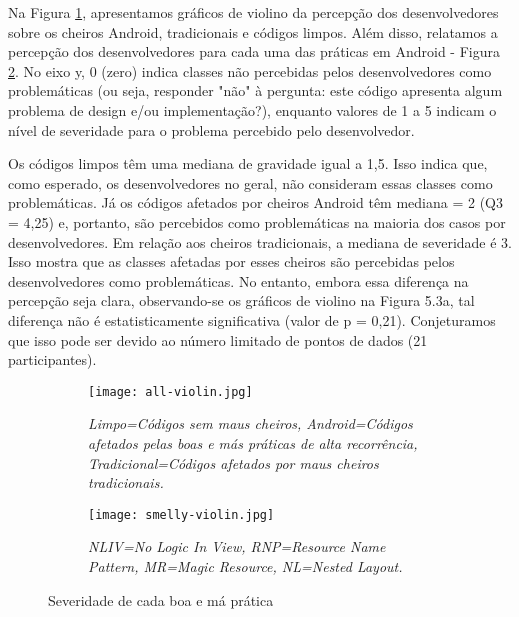 Na Figura \ref{fig:all-violin}, apresentamos gráficos de violino da percepção dos desenvolvedores sobre os cheiros Android, tradicionais e códigos limpos. Além disso, relatamos a percepção dos desenvolvedores para cada uma das práticas em Android - Figura \ref{fig:smelly-violin}. No eixo y, 0 (zero) indica classes não percebidas pelos desenvolvedores como problemáticas (ou seja, responder "não" à pergunta: este código apresenta algum problema de design e/ou implementação?), enquanto valores de 1 a 5 indicam o nível de severidade para o problema percebido pelo desenvolvedor.

Os códigos limpos têm uma mediana de gravidade igual a 1,5. Isso indica que, como esperado, os desenvolvedores no geral, não consideram essas classes como problemáticas. Já os códigos afetados por cheiros Android têm mediana = 2 (Q3 = 4,25) e, portanto, são percebidos como problemáticas na maioria dos casos por desenvolvedores. Em relação aos cheiros tradicionais, a mediana de severidade é 3. Isso mostra que as classes afetadas por esses cheiros são percebidas pelos desenvolvedores como problemáticas. No entanto, embora essa diferença na percepção seja clara, observando-se os gráficos de violino na Figura 5.3a, tal diferença não é estatisticamente significativa (valor de p = 0,21). Conjeturamos que isso pode ser devido ao número limitado de pontos de dados (21 participantes).

\begin{figure*}
\centering
\begin{subfigure}{.4\textwidth}
  \centering
  \texttt{[image: all-violin.jpg]}
  \caption{\footnotesize{\textit{Limpo=Códigos sem maus cheiros, Android=Códigos afetados pelas boas e más práticas de alta recorrência, Tradicional=Códigos afetados por maus cheiros tradicionais.}}}
  \label{fig:all-violin}
\end{subfigure}%
\hspace{5mm}
\begin{subfigure}{.4\textwidth}
  \centering
  \texttt{[image: smelly-violin.jpg]}
  \caption{\footnotesize{\textit{NLIV=No Logic In View, RNP=Resource Name Pattern, MR=Magic Resource, NL=Nested Layout.}}}
  \label{fig:smelly-violin}
\end{subfigure}
\caption{Severidade de cada boa e má prática}
\label{fig:test}
\end{figure*}


